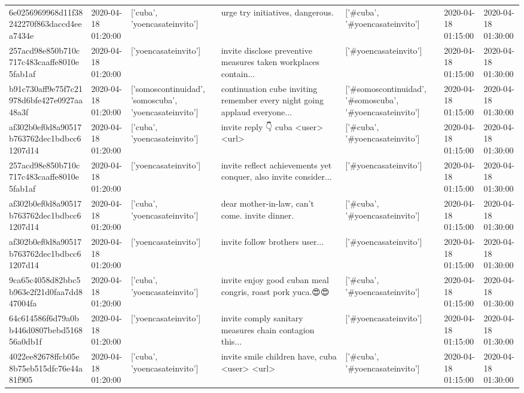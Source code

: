 \begin{tabular}{lllllll}
6e0256969968d11f38242270f863daccd4eea7434e & 2020-04-18 01:20:00 & ['cuba', 'yoencasateinvito'] & urge try initiatives, dangerous. & ['#cuba', '#yoencasateinvito'] & 2020-04-18 01:15:00 & 2020-04-18 01:30:00 \\
257acd98e850b710c717c483caaffe8010e5fab1af & 2020-04-18 01:20:00 & ['yoencasateinvito'] & invite disclose preventive measures taken workplaces contain... & ['#yoencasateinvito'] & 2020-04-18 01:15:00 & 2020-04-18 01:30:00 \\
b91c730aff9e75f7c21978d6bfe427e0927aa48a3f & 2020-04-18 01:20:00 & ['somoscontinuidad', 'somoscuba', 'yoencasateinvito'] & continuation cube inviting remember every night going applaud everyone... & ['#somoscontinuidad', '#somoscuba', '#yoencasateinvito'] & 2020-04-18 01:15:00 & 2020-04-18 01:30:00 \\
af302b0ef0d8a90517b763762dec1bdbcc61207d14 & 2020-04-18 01:20:00 & ['cuba', 'yoencasateinvito'] & invite reply 👇 cuba <user> <url> & ['#cuba', '#yoencasateinvito'] & 2020-04-18 01:15:00 & 2020-04-18 01:30:00 \\
257acd98e850b710c717c483caaffe8010e5fab1af & 2020-04-18 01:20:00 & ['yoencasateinvito'] & invite reflect achievements yet conquer, also invite consider... & ['#yoencasateinvito'] & 2020-04-18 01:15:00 & 2020-04-18 01:30:00 \\
af302b0ef0d8a90517b763762dec1bdbcc61207d14 & 2020-04-18 01:20:00 & ['cuba', 'yoencasateinvito'] & dear mother-in-law, can't come. invite dinner. & ['#cuba', '#yoencasateinvito'] & 2020-04-18 01:15:00 & 2020-04-18 01:30:00 \\
af302b0ef0d8a90517b763762dec1bdbcc61207d14 & 2020-04-18 01:20:00 & ['yoencasateinvito'] & invite follow brothers user... & ['#yoencasateinvito'] & 2020-04-18 01:15:00 & 2020-04-18 01:30:00 \\
9ca65c4058d82bbc5b963e2f21d0faa7dd847004fa & 2020-04-18 01:20:00 & ['cuba', 'yoencasateinvito'] & invite enjoy good cuban meal congris, roast pork yuca.😍😍 & ['#cuba', '#yoencasateinvito'] & 2020-04-18 01:15:00 & 2020-04-18 01:30:00 \\
64c614586f6d79a0bb446d0807bebd516856a0db1f & 2020-04-18 01:20:00 & ['yoencasateinvito'] & invite comply sanitary measures chain contagion this... & ['#yoencasateinvito'] & 2020-04-18 01:15:00 & 2020-04-18 01:30:00 \\
4022ee82678ffcb05e8b75eb515dfc76e44a81f905 & 2020-04-18 01:20:00 & ['cuba', 'yoencasateinvito'] & invite smile children have, cuba <user> <url> & ['#cuba', '#yoencasateinvito'] & 2020-04-18 01:15:00 & 2020-04-18 01:30:00 \\

\end{tabular}

